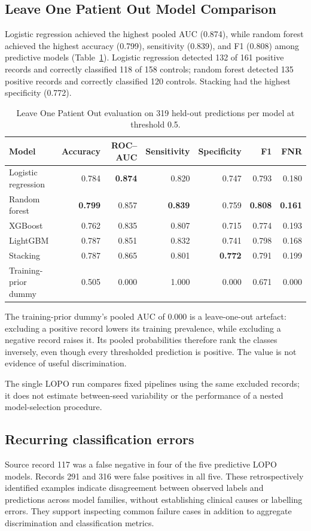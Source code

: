 \subsection{Leave One Patient Out Model Comparison}
Logistic regression achieved the highest pooled AUC (0.874), while random forest achieved the highest accuracy (0.799), sensitivity (0.839), and F1 (0.808) among predictive models (Table~\ref{tab:building-lopo-results}). Logistic regression detected 132 of 161 positive records and correctly classified 118 of 158 controls; random forest detected 135 positive records and correctly classified 120 controls. Stacking had the highest specificity (0.772).

\begin{table}[tbp]
\centering
\footnotesize
\caption{Leave One Patient Out evaluation on 319 held-out predictions per model at threshold 0.5.}
\label{tab:building-lopo-results}
\begin{tabular}{@{}lrrrrrr@{}}
\toprule
Model & Accuracy & ROC--AUC & Sensitivity & Specificity & F1 & FNR \\
\midrule
Logistic regression & 0.784 & \textbf{0.874} & 0.820 & 0.747 & 0.793 & 0.180 \\
Random forest & \textbf{0.799} & 0.857 & \textbf{0.839} & 0.759 & \textbf{0.808} & \textbf{0.161} \\
XGBoost & 0.762 & 0.835 & 0.807 & 0.715 & 0.774 & 0.193 \\
LightGBM & 0.787 & 0.851 & 0.832 & 0.741 & 0.798 & 0.168 \\
Stacking & 0.787 & 0.865 & 0.801 & \textbf{0.772} & 0.791 & 0.199 \\
\midrule
Training-prior dummy & 0.505 & 0.000 & 1.000 & 0.000 & 0.671 & 0.000 \\
\bottomrule
\end{tabular}
\end{table}
The training-prior dummy's pooled AUC of 0.000 is a leave-one-out artefact: excluding a positive record lowers its training prevalence, while excluding a negative record raises it. Its pooled probabilities therefore rank the classes inversely, even though every thresholded prediction is positive. The value is not evidence of useful discrimination.

The single LOPO run compares fixed pipelines using the same excluded records; it does not estimate between-seed variability or the performance of a nested model-selection procedure.

\subsection{Recurring classification errors}
Source record 117 was a false negative in four of the five predictive LOPO models. Records 291 and 316 were false positives in all five. These retrospectively identified examples indicate disagreement between observed labels and predictions across model families, without establishing clinical causes or labelling errors. They support inspecting common failure cases in addition to aggregate discrimination and classification metrics.


